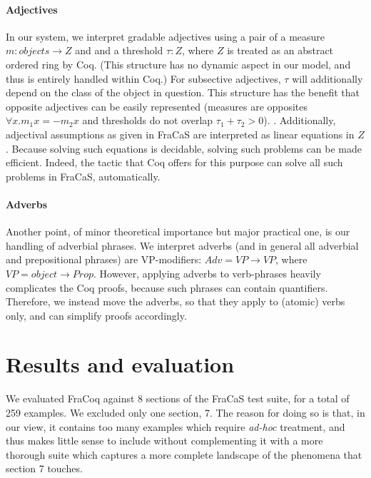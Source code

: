 \documentclass{article}
\begin{document}
\paragraph{Adjectives}
In our system, we interpret gradable adjectives using a pair of a
measure $m : objects → Z$ and and a threshold $τ : Z$, where $Z$ is
treated as an abstract ordered ring by Coq. (This structure has no
dynamic aspect in our model, and thus is entirely handled within Coq.)
For subsective adjectives, $τ$ will additionally depend on the class
of the object in question. This structure has the benefit that
opposite adjectives can be easily represented (measures are opposites
$∀x. m_1 x = -m_2 x$ and thresholds do not overlap $τ_1 + τ_2 > 0$).
.  Additionally,
adjectival assumptions as given in FraCaS are interpreted as linear
equations in $Z$. Because solving such equations is decidable, solving
such problems can be made efficient. Indeed, the tactic that Coq
offers for this purpose can solve all such problems in FraCaS,
automatically.


\paragraph{Adverbs}
Another point, of minor theoretical importance but major practical
one, is our handling of adverbial phrases. We interpret adverbs (and
in general all adverbial and prepositional phrases) are VP-modifiers:
$Adv = VP → VP$, where $VP = object → Prop$. However, applying
adverbs to verb-phrases heavily complicates the Coq proofs, because
such phrases can contain quantifiers. Therefore, we instead move the
adverbs, so that they apply to (atomic) verbs only, and can simplify
proofs accordingly. 



\section{Results and evaluation}

We evaluated FraCoq against 8 sections of the FraCaS test suite, for a
total of 259 examples. We excluded only one section, 7. The reason for
doing so is that, in our view, it contains too many examples which
require \textit{ad-hoc} treatment, and thus makes little sense to
include without complementing it with a more thorough suite which
captures a more complete landscape of the phenomena that section 7
touches.
\end{document}
